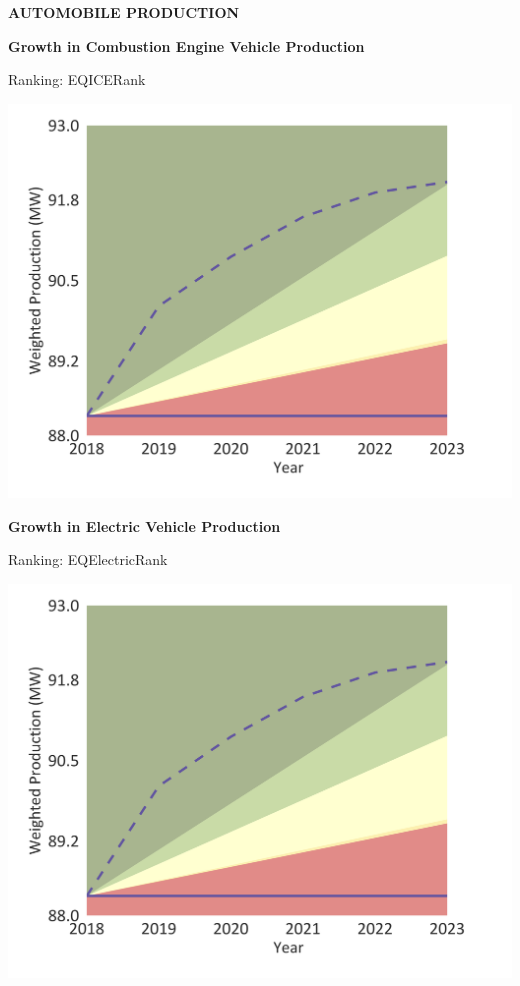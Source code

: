 \documentclass[10pt,twoside,table]{article}\usepackage[]{graphicx}\usepackage[]{color}
\begin{document}
	\begin{center}
		\textbf{AUTOMOBILE PRODUCTION}
	\end{center}
	
	\begin{minipage}[t]{.49\linewidth}
		\textbf{Growth in Combustion Engine Vehicle Production}
		
		Ranking: EQICERank
		
		\includegraphics[trim = {0 0cm 0 0},width=1\linewidth]{CAFigures/Fig10}
		
	\end{minipage}	
	\hspace{.02\linewidth}
	\begin{minipage}[t]{.49\textwidth}
		\textbf{Growth in Electric Vehicle Production}
		
		Ranking: EQElectricRank
		
		\includegraphics[trim = {0 0cm 0 0},width=1\linewidth]{CAFigures/Fig10}
		
	\end{minipage}		
		
\end{document}
